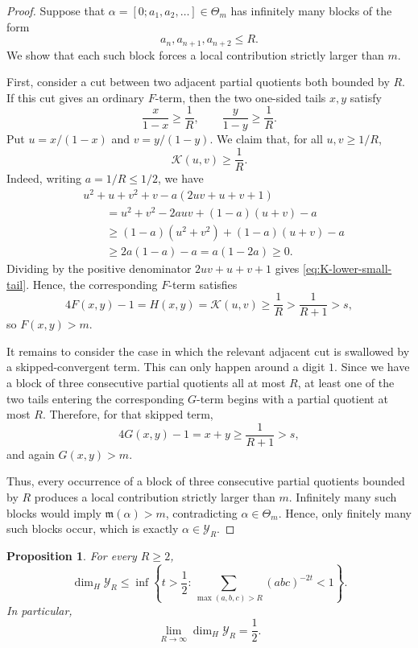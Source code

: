 \documentclass[11pt]{amsart}
\newtheorem{proposition}[theorem]{Proposition}
\newcommand{\Kfun}{\mathcal K}
\begin{document}
\begin{proof}
Suppose that $\alpha=[0;a_1,a_2,\ldots]\in\Theta_m$ has infinitely many blocks of the form
$$
a_n,a_{n+1},a_{n+2}\le R.
$$
We show that each such block forces a local contribution strictly larger than
$m$.

First, consider a cut between two adjacent partial quotients both bounded by $R$.  If this cut gives an ordinary $F$-term, then the two one-sided tails $x,y$ satisfy
$$
\frac{x}{1-x}\ge \frac1R,
\qquad
\frac{y}{1-y}\ge \frac1R.
$$
Put $u=x/(1-x)$ and $v=y/(1-y)$.  We claim that, for all $u,v\ge1/R$,
\begin{equation}\label{eq:K-lower-small-tail}
\Kfun(u,v)\ge \frac1R.
\end{equation}
Indeed, writing $a=1/R\le1/2$, we have
\begin{align*}
&u^2+u+v^2+v
-a(2uv+u+v+1)   \\
&\qquad =
u^2+v^2-2auv+(1-a)(u+v)-a                  \\
&\qquad \ge
(1-a)(u^2+v^2)+(1-a)(u+v)-a                 \\
&\qquad \ge
2a(1-a)-a
=
a(1-2a)
\ge0.
\end{align*}
Dividing by the positive denominator $2uv+u+v+1$ gives
\eqref{eq:K-lower-small-tail}.  Hence, the corresponding $F$-term satisfies
$$
4F(x,y)-1=H(x,y)=\Kfun(u,v)\ge\frac1R>\frac1{R+1}>s,
$$
so $F(x,y)>m$.

It remains to consider the case in which the relevant adjacent cut is swallowed by a skipped-convergent term.  This can only happen around a digit $1$.  Since we have a block of three consecutive partial quotients all at most $R$, at least one of the two tails entering the corresponding $G$-term begins with a partial quotient at most $R$.  Therefore, for that skipped term,
$$
4G(x,y)-1=x+y\ge \frac1{R+1}>s,
$$
and again $G(x,y)>m$.

Thus, every occurrence of a block of three consecutive partial quotients bounded by $R$ produces a local contribution strictly larger than $m$.  Infinitely many such blocks would imply $\mathfrak m(\alpha)>m$, contradicting $\alpha\in\Theta_m$.  Hence, only finitely many such blocks occur, which is exactly $\alpha\in\mathcal Y_R$.
\end{proof}

\begin{proposition}\label{prop:YR-dimension-bound}
For every $R\ge2$,
$$
\dim_H\mathcal Y_R
\le
\inf\left\{
t>\frac12:
\sum_{\max(a,b,c)>R}(abc)^{-2t}<1
\right\}.
$$
In particular,
$$
\lim_{R\to\infty}\dim_H\mathcal Y_R=\frac12.
$$
\end{proposition}
\end{document}
